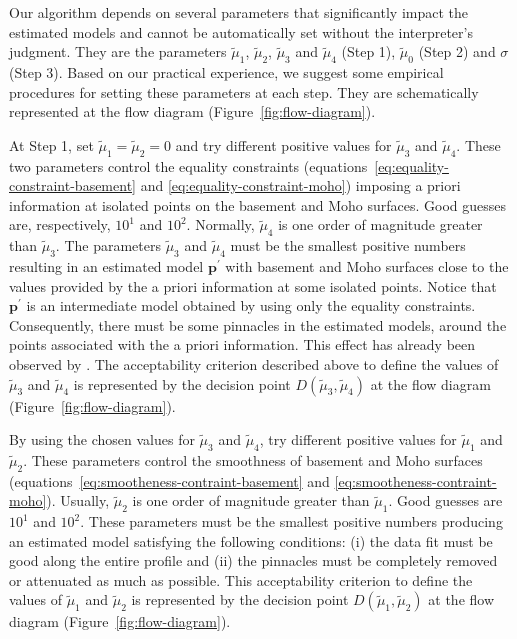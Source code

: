 \documentclass[manuscript]{geophysics}
\begin{document}
Our algorithm depends on several parameters that significantly impact the estimated models
and cannot be automatically set without the interpreter’s judgment.
They are the parameters $\tilde{\mu}_{1}$, $\tilde{\mu}_{2}$, $\tilde{\mu}_{3}$ 
and $\tilde{\mu}_{4}$ (Step 1), $\tilde{\mu}_{0}$ (Step 2) and $\sigma$ (Step 3).
Based on our practical experience, we suggest some empirical procedures for setting these
parameters at each step. They are schematically represented at the flow diagram 
(Figure~\ref{fig:flow-diagram}).

At Step 1, set $\tilde{\mu}_{1} = \tilde{\mu}_{2} = 0$ and try different positive 
values for $\tilde{\mu}_{3}$ and $\tilde{\mu}_{4}$. 
These two parameters control the equality constraints
(equations~\ref{eq:equality-constraint-basement} and \ref{eq:equality-constraint-moho})
imposing a priori information at isolated points on the basement and Moho surfaces.
Good guesses are, respectively,
$10^{1}$ and $10^{2}$. Normally, $\tilde{\mu}_{4}$ is one order of magnitude greater
than $\tilde{\mu}_{3}$. 
The parameters $\tilde{\mu}_{3}$ and $\tilde{\mu}_{4}$ 
must be the smallest positive numbers resulting in an estimated model $\mathbf{p}^{\prime}$ 
with basement and Moho surfaces close to the values provided by the a priori information
at some isolated points. Notice that $\mathbf{p}^{\prime}$ is an intermediate model 
obtained by using only the equality constraints. Consequently, there must be some
pinnacles in the estimated models, around the points associated with the a priori 
information. This effect has already been observed by \citet{barbosa-etal1997}.
The acceptability criterion described above to define the values of $\tilde{\mu}_{3}$ and 
$\tilde{\mu}_{4}$ is represented by the decision point $D(\tilde{\mu}_{3}, \tilde{\mu}_{4})$ 
at the flow diagram (Figure~\ref{fig:flow-diagram}).

By using the chosen values for $\tilde{\mu}_{3}$ and $\tilde{\mu}_{4}$, 
try different positive values for $\tilde{\mu}_{1}$ and $\tilde{\mu}_{2}$.
These parameters control the smoothness of basement and Moho surfaces
(equations~\ref{eq:smootheness-contraint-basement} and \ref{eq:smootheness-contraint-moho}).
Usually, $\tilde{\mu}_{2}$ is one order of magnitude greater than $\tilde{\mu}_{1}$.
Good guesses are $10^{1}$ and $10^{2}$.
These parameters must be the smallest positive numbers producing an estimated model
satisfying the following conditions: (i) the data fit must be good along the entire profile
and (ii) the pinnacles must be completely removed or attenuated as much as possible.
This acceptability criterion to define the values of $\tilde{\mu}_{1}$ and 
$\tilde{\mu}_{2}$ is represented by the decision point $D(\tilde{\mu}_{1}, \tilde{\mu}_{2})$ 
at the flow diagram (Figure~\ref{fig:flow-diagram}).
\end{document}
